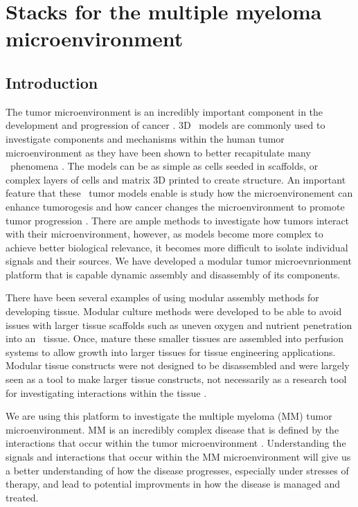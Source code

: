 \chapter{Stacks for the multiple myeloma microenvironment}
\label{Chap:Stacks}

\section{Introduction}

The tumor microenvironment is an incredibly important component in the development and progression of cancer \cite{Hanahan2012, Whiteside2008, Lorusso2008}. 3D \invitro\ models are commonly used to investigate components and mechanisms within the human tumor microenvironment as they have been shown to better recapitulate many \invivo\ phenomena \cite{Sung2013, Fischbach2007, Hickman2014Three-dimensionalVivo., stock2016capturing, Baker2012, Debnath2005, Wu2014, Asghar2015}. The models can be as simple as cells seeded in scaffolds, or complex layers of cells and matrix 3D printed to create structure. An important feature that these \invitro\ tumor models enable is study how the microenvironement can enhance tumorogesis and how cancer changes the microenvironment to promote tumor progression \cite{Verbridge2010, Chandler2012, Ingber2008, Polyak2009}. There are ample methods to investigate how tumors interact with their microenvironment, however, as models become more complex to achieve better biological relevance, it becomes more difficult to isolate individual signals and their sources. We have developed a modular tumor microevnrionment platform that is capable dynamic assembly and disassembly of its components. 

There have been several examples of using modular assembly methods for developing tissue. Modular culture methods were developed to be able to avoid issues with larger tissue scaffolds such as uneven oxygen and nutrient penetration into an \invitro\ tissue. Once, mature these smaller tissues are assembled into perfusion systems to allow growth into larger tissues for tissue engineering applications. Modular tissue constructs were not designed to be disassembled and were largely seen as a tool to make larger tissue constructs, not necessarily as a research tool for investigating interactions within the tissue \cite{Lovett2009, Lee2012a, Bruzewicz2008, Nichol2009}.

We are using this platform to investigate the multiple myeloma (MM) tumor microenvironment. MM is an incredibly complex disease that is defined by the interactions that occur within the tumor microenvironment \cite{Mahindra2010a, Manier2012, Ribatti2006}. Understanding the signals and interactions that occur within the MM microenvironment will give us a better understanding of how the disease progresses, especially under stresses of therapy, and lead to potential improvments in how the disease is managed and treated.

